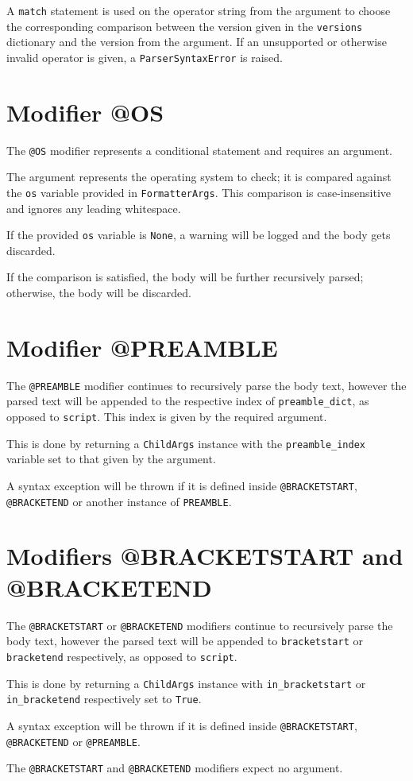 A \verb|match| statement is used on the operator string from the argument to choose the corresponding comparison between the version given in the \verb|versions| dictionary and the version from the argument. If an unsupported or otherwise invalid operator is given, a \verb|ParserSyntaxError| is raised.

\section{Modifier @OS}

The \verb|@OS| modifier represents a conditional statement and requires an argument. 

The argument represents the operating system to check; it is compared against the \verb|os| variable provided in \verb|FormatterArgs|. This comparison is case-insensitive and ignores any leading whitespace. 

If the provided \verb|os| variable is \verb|None|, a warning will be logged and the body gets discarded. 

If the comparison is satisfied, the body will be further recursively parsed; otherwise, the body will be discarded.

\section{Modifier @PREAMBLE} 

The \verb|@PREAMBLE| modifier continues to recursively parse the body text, however the parsed text will be appended to the respective index of \verb|preamble_dict|, as opposed to \verb|script|. This index is given by the required argument.

This is done by returning a \verb|ChildArgs| instance with the \verb|preamble_index| variable set to that given by the argument. 

A syntax exception will be thrown if it is defined inside \verb|@BRACKETSTART|, \verb|@BRACKETEND| or another instance of \verb|PREAMBLE|.

\section{Modifiers @BRACKETSTART and @BRACKETEND}

The \verb|@BRACKETSTART| or \verb|@BRACKETEND| modifiers continue to recursively parse the body text, however the parsed text will be appended to \verb|bracketstart| or \verb|bracketend| respectively, as opposed to \verb|script|. 

This is done by returning a \verb|ChildArgs| instance with \verb|in_bracketstart| or \\\verb|in_bracketend| respectively set to \verb|True|.

A syntax exception will be thrown if it is defined inside \verb|@BRACKETSTART|, \verb|@BRACKETEND| or \verb|@PREAMBLE|.

The \verb|@BRACKETSTART| and \verb|@BRACKETEND| modifiers expect no argument.
